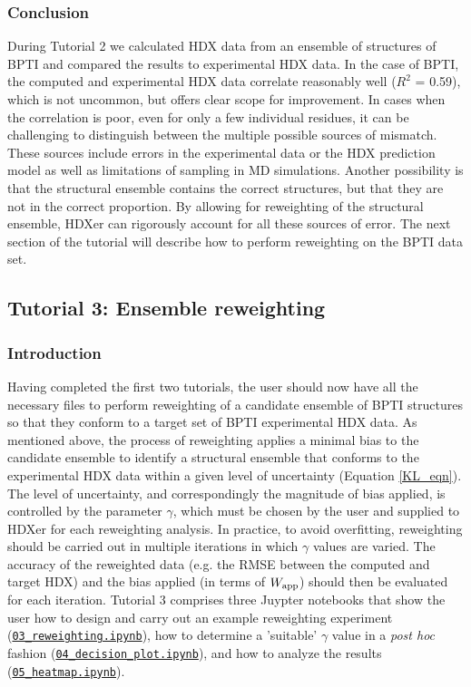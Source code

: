 \documentclass[9pt,tutorial,ASAPversion]{livecoms}
\begin{document}
\subsubsection{Conclusion}

During Tutorial 2 we calculated HDX data from an ensemble of structures of BPTI and compared the results to experimental HDX data. 
In the case of BPTI, the computed and experimental HDX data correlate reasonably well ($R^2$ = 0.59), which is not uncommon, but offers clear scope for improvement.
In cases when the correlation is poor, even for only a few individual residues, it can be challenging to distinguish between the multiple possible sources of mismatch. 
These sources include errors in the experimental data or the HDX prediction model as well as limitations of sampling in MD simulations. 
Another possibility is that the structural ensemble contains the correct structures, but that they are not in the correct proportion. 
By allowing for reweighting of the structural ensemble, HDXer can rigorously account for all these sources of error. 
The next section of the tutorial will describe how to perform reweighting on the BPTI data set. 

\subsection{Tutorial 3: Ensemble reweighting}\label{tutorial_3}

\subsubsection{Introduction}

Having completed the first two tutorials, the user should now have all the necessary files to perform reweighting of a candidate ensemble of BPTI structures so that they conform to a target set of BPTI experimental HDX data.
As mentioned above, the process of reweighting applies a minimal bias to the candidate ensemble to identify a structural ensemble that conforms to the experimental HDX data within a given level of uncertainty (Equation \ref{KL_eqn}).
The level of uncertainty, and correspondingly the magnitude of bias applied, is controlled by the parameter $\gamma$, which must be chosen by the user and supplied to HDXer for each reweighting analysis.
In practice, to avoid overfitting, reweighting should be carried out in multiple iterations in which $\gamma$ values are varied. 
The accuracy of the reweighted data (e.g. the RMSE between the computed and target HDX) and the bias applied (in terms of $W_\textnormal{app}$) should then be evaluated for each iteration.
Tutorial 3 comprises three Juypter notebooks that show the user how to design and carry out an example reweighting experiment (\href{https://github.com/Lucy-Forrest-Lab/HDXer/blob/master/tutorials/notebooks/03_reweighting.ipynb}{\texttt{03\_reweighting.ipynb}}), how to determine a 'suitable' $\gamma$ value in a \textit{post hoc} fashion (\href{https://github.com/Lucy-Forrest-Lab/HDXer/blob/master/tutorials/notebooks/04_decision_plot.ipynb}{\texttt{04\_decision\_plot.ipynb}}), and how to analyze the results (\href{https://github.com/Lucy-Forrest-Lab/HDXer/blob/master/tutorials/notebooks/05_heatmap.ipynb}{\texttt{05\_heatmap.ipynb}}). 
\end{document}

